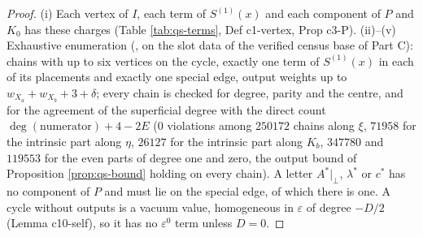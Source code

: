 \documentclass[11pt]{article}
\numberwithin{equation}{section}
\theoremstyle{plain}
\theoremstyle{definition}
\begin{document}
\begin{proof}
(i) Each vertex of $I$, each term of $S^{(1)}(x)$ and each component of $P$ and $K_0$ has these charges (Table \ref{tab:qs-terms}, Def c1-vertex, Prop c3-P). (ii)--(v) Exhaustive enumeration (, on the slot data of the verified census base of Part C): chains with up to six vertices on the cycle, exactly one term of $S^{(1)}(x)$ in each of its placements and exactly one special edge, output weights up to $w_{X_a}+w_{X_b}+3+\delta$; every chain is checked for degree, parity and the centre, and for the agreement of the superficial degree with the direct count $\deg(\text{numerator})+4-2E$ ($0$ violations among $250172$ chains along $\xi$, $71958$ for the intrinsic part along $\eta$, $26127$ for the intrinsic part along $K_b$, $347780$ and $119553$ for the even parts of degree one and zero, the output bound of Proposition \ref{prop:qs-bound} holding on every chain). A letter $A^*|_\perp$, $\lambda^*$ or $c^*$ has no component of $P$ and must lie on the special edge, of which there is one. A cycle without outputs is a vacuum value, homogeneous in $\varepsilon$ of degree $-D/2$ (Lemma c10-self), so it has no $\varepsilon^0$ term unless $D=0$.
\end{proof}
\end{document}
